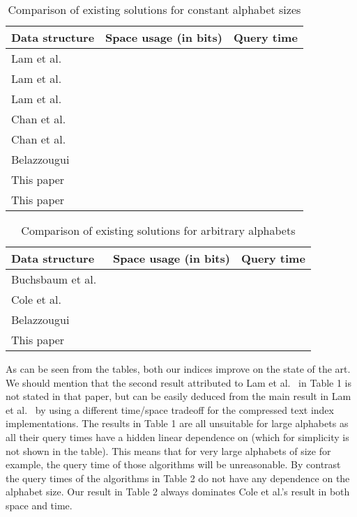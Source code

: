 \documentclass{article}
\newcommand{\?}{\mskip1.5mu}
\begin{document}
\begin{table}
\centering
\begin{tabular}{|l|l|l|}
  \hline
  Data structure &  Space usage (in bits) & Query time \\
  \hline
  Lam et al.~\cite{LSW08}  &  & \\
  Lam et al.~\cite{LSW08}  &  & \\
  Lam et al.~\cite{LSW08}  &  & \\
  \hline
   Chan et al.~\cite{chan2011linear} &   &  \\
   Chan et al.~\cite{CLSTW10} &  &  \\
  \hline
  Belazzougui~\cite{B09} &  & \\
  \hline
   This paper &  &  \\
   This paper &  &  \\
  \hline
\end{tabular}
\caption{Comparison of existing solutions for constant alphabet sizes}
\label{table:compar_table0}
\end{table}
\begin{table}
\centering
\begin{tabular}{|l|l|l|}
  \hline
  Data structure &  Space usage (in bits) & Query time \\ 
  \hline
  Buchsbaum et al.~\cite{BGW00} &  & \\
  Cole et al.~\cite{CGL04} &   & \\
  Belazzougui~\cite{B09} &  & \\
  This paper &  & \\ 
  \hline
\end{tabular}
\caption{Comparison of existing solutions for arbitrary alphabets}
\label{table:compar_table1}
\end{table}
As can be seen from the tables, both our indices improve on the state of the art. We should mention that the second result attributed to Lam et al.~\cite{LSW08} in Table 1 is not stated in that paper, but can be easily deduced from the main result in Lam et al.~\cite{LSW08} by using a different time/space tradeoff for the compressed text index implementations. 
The results in Table 1 are all unsuitable for large alphabets as all their query times have a hidden linear dependence on  (which for simplicity is not shown in the table). This means that for very large alphabets of size   for example, the query time of those algorithms will be unreasonable. By contrast the query times of the algorithms in Table 2 do not have any dependence on the alphabet size. Our result in Table 2 always dominates Cole et al.'s result in both space and time. 
\end{document}
